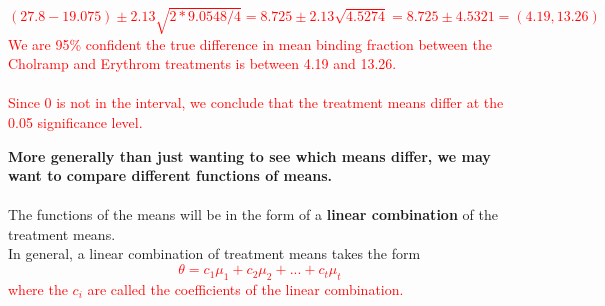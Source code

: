 \textcolor{red}{
$$(27.8-19.075)\pm 2.13\sqrt{2*9.0548/4} = 8.725\pm 2.13\sqrt{4.5274} = 8.725\pm 4.5321 = (4.19,13.26)$$
We are 95\% confident the true difference in mean binding fraction between the Cholramp and Erythrom treatments is between 4.19 and 13.26.\\~\\
Since 0 is not in the interval, we conclude that the treatment means differ at the 0.05 significance level.
}

\newpage

\Large\textbf{More generally than just wanting to see which means differ, we may want to compare different functions of means.}\large\\~\\
The functions of the means will be in the form of a \textbf{linear combination} of the treatment means.\\
In general, a linear combination of treatment means takes the form%
\textcolor{red}{$$\theta=c_{1}\mu_{1}+c_{2}\mu_{2}+...+c_{t}\mu_{t}$$
where the $c_{i}$ are called the coefficients of the linear combination.}\\~\\

